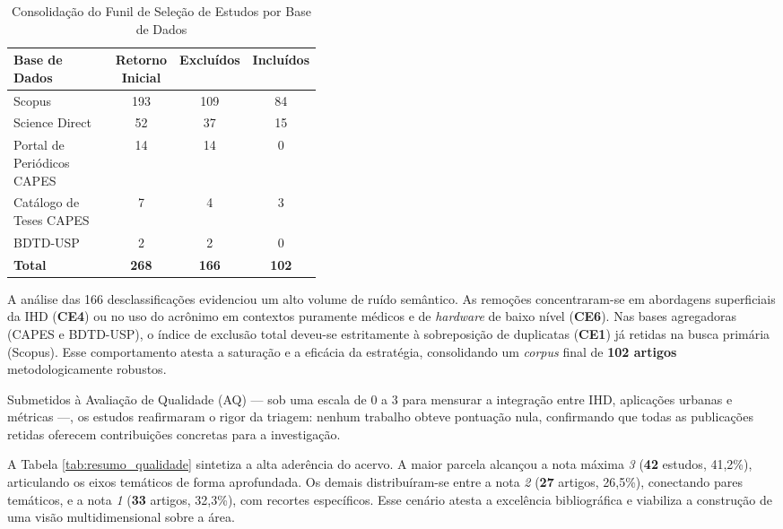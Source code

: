 \documentclass[12pt]{article}
\begin{document}
\begin{table}[H]
\centering
\caption{Consolidação do Funil de Seleção de Estudos por Base de Dados}
\label{tab:funil_selecao}
\small
\begin{tabular}{p{0.40\linewidth} c c c}
\hline
\textbf{Base de Dados} & \textbf{Retorno Inicial} & \textbf{Excluídos} & \textbf{Incluídos} \\ \hline
Scopus & 193 & 109 & 84 \\
Science Direct & 52 & 37 & 15 \\
Portal de Periódicos CAPES & 14 & 14 & 0 \\
Catálogo de Teses CAPES & 7 & 4 & 3 \\
BDTD-USP & 2 & 2 & 0 \\ \hline
\textbf{Total} & \textbf{268} & \textbf{166} & \textbf{102} \\ \hline
\end{tabular}
\end{table}
\vspace{-0.1 cm} 

A análise das 166 desclassificações evidenciou um alto volume de ruído semântico. As remoções concentraram-se em abordagens superficiais da IHD (\textbf{CE4}) ou no uso do acrônimo em contextos puramente médicos e de \textit{hardware} de baixo nível (\textbf{CE6}). Nas bases agregadoras (CAPES e BDTD-USP), o índice de exclusão total deveu-se estritamente à sobreposição de duplicatas (\textbf{CE1}) já retidas na busca primária (Scopus). Esse comportamento atesta a saturação e a eficácia da estratégia, consolidando um \textit{corpus} final de \textbf{102 artigos} metodologicamente robustos.

Submetidos à Avaliação de Qualidade (AQ) — sob uma escala de 0 a 3 para mensurar a integração entre IHD, aplicações urbanas e métricas —, os estudos reafirmaram o rigor da triagem: nenhum trabalho obteve pontuação nula, confirmando que todas as publicações retidas oferecem contribuições concretas para a investigação.

A Tabela \ref{tab:resumo_qualidade} sintetiza a alta aderência do acervo. A maior parcela alcançou a nota máxima \emph{3} (\textbf{42} estudos, 41,2\%), articulando os eixos temáticos de forma aprofundada. Os demais distribuíram-se entre a nota \emph{2} (\textbf{27} artigos, 26,5\%), conectando pares temáticos, e a nota \emph{1} (\textbf{33} artigos, 32,3\%), com recortes específicos. Esse cenário atesta a excelência bibliográfica e viabiliza a construção de uma visão multidimensional sobre a área.
\end{document}
